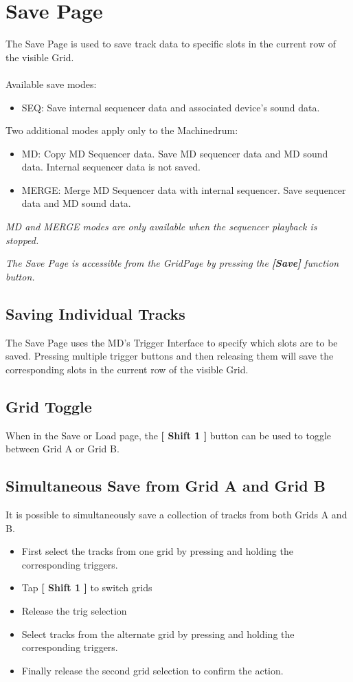 \chapter{Save Page}

The Save Page is used to save track data to specific slots in the current row of the visible  Grid.\\
\\
Available save modes:
\begin{itemize}
    \item SEQ: Save internal sequencer data and associated device's sound data.
\end{itemize}
Two additional modes apply only to the Machinedrum:
\begin{itemize}
    \item MD: Copy MD Sequencer data. Save MD sequencer data and MD sound data. Internal sequencer data is not saved.
    \item MERGE: Merge MD Sequencer data with internal sequencer. Save sequencer data and MD sound data.
\end{itemize}
\textit{MD and MERGE modes are only available when the sequencer playback is stopped.}
\\



\textit{The Save Page is accessible from the GridPage by pressing the  \textbf{[Save]} function button.}


\section{Saving Individual Tracks}
The Save Page uses the MD's Trigger Interface to specify which slots are to be saved. Pressing multiple trigger buttons and then releasing them will save the corresponding slots in the current row of the visible Grid.
\section{Grid Toggle}
When in the Save or Load page, the \textbf{[ Shift 1 ]} button can be used to toggle between Grid A or Grid B.
\section{Simultaneous Save from Grid A and Grid B}
It is possible to simultaneously save a collection of tracks from both Grids A and B. 
\begin{itemize}
\item First select the tracks from one grid by pressing and holding the corresponding triggers.
\item Tap \textbf{[ Shift 1 ]} to switch grids
\item Release the trig selection
\item Select tracks from the alternate grid by pressing and holding the corresponding triggers. 
\item Finally release the second grid selection to confirm the action. 
\end{itemize}

